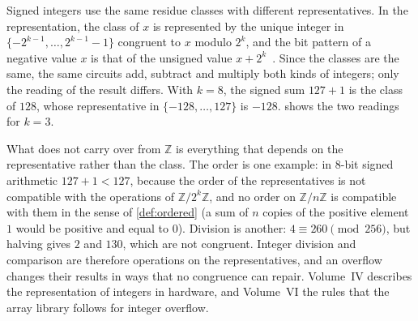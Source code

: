 Signed integers use the same residue classes with different representatives. In the  representation, the class of $x$ is represented by the unique integer in $\{-2^{k-1},\ldots,2^{k-1}-1\}$ congruent to $x$ modulo $2^k$, and the bit pattern of a negative value $x$ is that of the unsigned value $x+2^k$~\cite[Sect.~4.1]{knuth1997taocp2}. Since the classes are the same, the same circuits add, subtract and multiply both kinds of integers; only the reading of the result differs. With $k=8$, the signed sum $127+1$ is the class of $128$, whose representative in $\{-128,\ldots,127\}$ is $-128$.  shows the two readings for $k=3$.

\begin{figure}
\end{figure}

What does not carry over from $\mathbb Z$ is everything that depends on the representative rather than the class. The order is one example: in $8$-bit signed arithmetic $127+1<127$, because the order of the representatives is not compatible with the operations of $\mathbb Z/2^k\mathbb Z$, and no order on $\mathbb Z/n\mathbb Z$ is compatible with them in the sense of \cref{def:ordered} (a sum of $n$ copies of the positive element $1$ would be positive and equal to $0$). Division is another: $4\equiv260\pmod{256}$, but halving gives $2$ and $130$, which are not congruent. Integer division and comparison are therefore operations on the representatives, and an overflow changes their results in ways that no congruence can repair. Volume~IV describes the representation of integers in hardware, and Volume~VI the rules that the array library follows for integer overflow.

